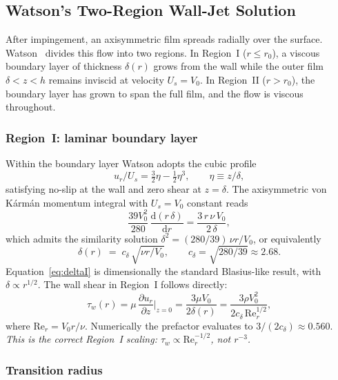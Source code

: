 \documentclass[aps,prfluids,reprint,amsmath,amssymb,floatfix]{revtex4-2}
\newcommand{\Rey}{\mathrm{Re}}
\newcommand{\dd}{\mathrm{d}}
\begin{document}
\subsection{Watson's Two-Region Wall-Jet Solution}

After impingement, an axisymmetric film spreads radially over the surface.
Watson~\citep{Watson1964} divides this flow into two regions. In Region~I
($r \leq r_0$), a viscous boundary layer of thickness $\delta(r)$ grows
from the wall while the outer film $\delta < z < h$ remains inviscid at
velocity $U_s = V_0$. In Region~II ($r > r_0$), the boundary layer has
grown to span the full film, and the flow is viscous throughout.

\subsubsection{Region~I: laminar boundary layer}

Within the boundary layer Watson adopts the cubic profile
\begin{equation}
  u_r/U_s = \tfrac{3}{2}\eta - \tfrac{1}{2}\eta^3,
  \qquad \eta \equiv z/\delta,
  \label{eq:cubic}
\end{equation}
satisfying no-slip at the wall and zero shear at $z = \delta$. The
axisymmetric von Kármán momentum integral with $U_s = V_0$ constant reads
\begin{equation}
  \frac{39 V_0^2}{280} \,\frac{\dd(r\,\delta)}{\dd r}
  = \frac{3\,r\,\nu\,V_0}{2\,\delta},
  \label{eq:karman}
\end{equation}
which admits the similarity solution $\delta^2 = (280/39)\,\nu r/V_0$,
or equivalently
\begin{equation}
  \boxed{\;\delta(r) \;=\; c_\delta\,\sqrt{\nu r/V_0},
  \qquad c_\delta = \sqrt{280/39} \approx 2.68.\;}
  \label{eq:deltaI}
\end{equation}
Equation~\eqref{eq:deltaI} is dimensionally the standard Blasius-like
result, with $\delta \propto r^{1/2}$. The wall shear in Region~I follows
directly:
\begin{equation}
  \tau_w(r) = \mu\,\frac{\partial u_r}{\partial z}\bigg|_{z=0}
  = \frac{3\mu V_0}{2\delta(r)}
  = \frac{3\rho V_0^2}{2 c_\delta\,\Rey_r^{1/2}},
  \label{eq:tauI}
\end{equation}
where $\Rey_r = V_0 r/\nu$. Numerically the prefactor evaluates to
$3/(2 c_\delta) \approx 0.560$. \emph{This is the correct Region~I scaling:
$\tau_w \propto \Rey_r^{-1/2}$, not $r^{-3}$.}

\subsubsection{Transition radius}
\end{document}
